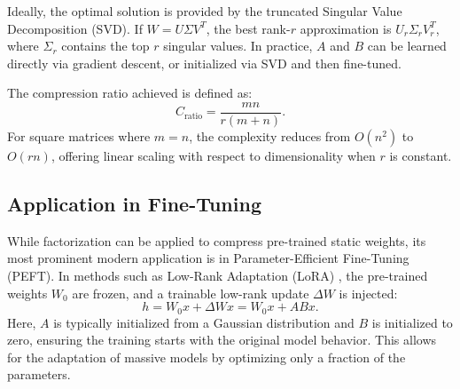 Ideally, the optimal solution is provided by the truncated Singular Value Decomposition (SVD). If $W = U \Sigma V^T$, the best rank-$r$ approximation is $U_r \Sigma_r V_r^T$, where $\Sigma_r$ contains the top $r$ singular values. In practice, $A$ and $B$ can be learned directly via gradient descent, or initialized via SVD and then fine-tuned.

The compression ratio achieved is defined as:
\begin{equation}
    C_{\text{ratio}} = \frac{mn}{r(m+n)}.
\end{equation}
For square matrices where $m=n$, the complexity reduces from $O(n^2)$ to $O(rn)$, offering linear scaling with respect to dimensionality when $r$ is constant.

\subsection{Application in Fine-Tuning}

While factorization can be applied to compress pre-trained static weights, its most prominent modern application is in Parameter-Efficient Fine-Tuning (PEFT). In methods such as Low-Rank Adaptation (LoRA) \cite{hu2021lora}, the pre-trained weights $W_0$ are frozen, and a trainable low-rank update $\Delta W$ is injected:
\begin{equation}
    h = W_0 x + \Delta W x = W_0 x + AB x.
\end{equation}
Here, $A$ is typically initialized from a Gaussian distribution and $B$ is initialized to zero, ensuring the training starts with the original model behavior. This allows for the adaptation of massive models by optimizing only a fraction of the parameters.


